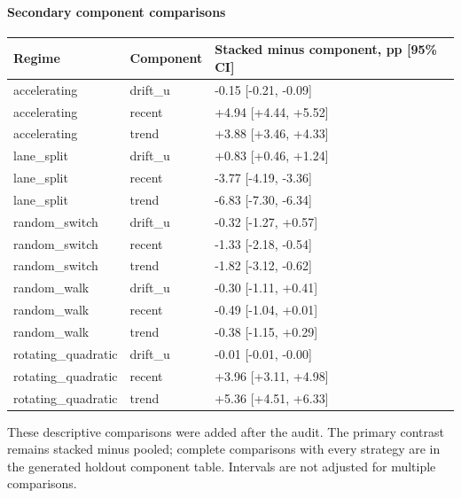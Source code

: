 \paragraph{Secondary component comparisons}
\begin{center}\small\begin{tabular}{lll}
\toprule
Regime & Component & Stacked minus component, pp [95\% CI]\\\midrule
accelerating & drift\_u & -0.15 [-0.21, -0.09]\\
accelerating & recent & +4.94 [+4.44, +5.52]\\
accelerating & trend & +3.88 [+3.46, +4.33]\\
lane\_split & drift\_u & +0.83 [+0.46, +1.24]\\
lane\_split & recent & -3.77 [-4.19, -3.36]\\
lane\_split & trend & -6.83 [-7.30, -6.34]\\
random\_switch & drift\_u & -0.32 [-1.27, +0.57]\\
random\_switch & recent & -1.33 [-2.18, -0.54]\\
random\_switch & trend & -1.82 [-3.12, -0.62]\\
random\_walk & drift\_u & -0.30 [-1.11, +0.41]\\
random\_walk & recent & -0.49 [-1.04, +0.01]\\
random\_walk & trend & -0.38 [-1.15, +0.29]\\
rotating\_quadratic & drift\_u & -0.01 [-0.01, -0.00]\\
rotating\_quadratic & recent & +3.96 [+3.11, +4.98]\\
rotating\_quadratic & trend & +5.36 [+4.51, +6.33]\\
\bottomrule\end{tabular}\end{center}

These descriptive comparisons were added after the audit. The primary contrast remains stacked minus pooled; complete comparisons with every strategy are in the generated holdout component table. Intervals are not adjusted for multiple comparisons.

\clearpage

